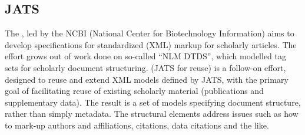 \subsection{JATS}
The , led by the NCBI (National Center for Biotechnology Information) aims to develop specifications for standardized (XML) markup for scholarly articles.  The effort grows out of work done on so-called ``NLM DTDS'', which modelled tag sets for scholarly document structuring.   (JATS for reuse) is a follow-on effort, designed to reuse and extend XML models defined by JATS, with the primary goal of facilitating reuse of existing scholarly material (publications and supplementary data). The result is a set of models specifying document structure, rather than simply metadata.  The structural elements address issues such as how to mark-up authors and affiliations, citations, data citations and the like.